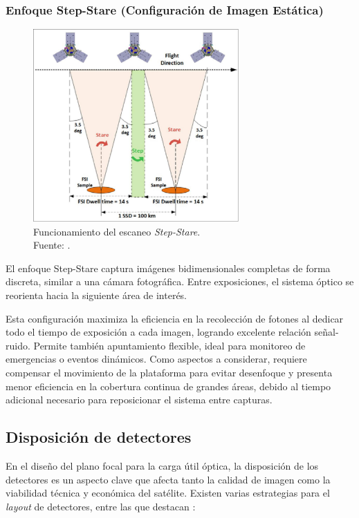 \subsubsection{Enfoque Step-Stare (Configuración de Imagen Estática)}

\begin{figure}[H]
    \centering
    \includegraphics[width=0.7\textwidth]{3.Conceptos_Previos/Step Stare.jpeg}
    \caption{Funcionamiento del escaneo \textit{Step-Stare}.\\Fuente: \cite{step_stare_system}.}
    \label{fig:Stepstare}
\end{figure}

El enfoque Step-Stare captura imágenes bidimensionales completas de forma discreta, similar a una cámara fotográfica. Entre exposiciones, el sistema óptico se reorienta hacia la siguiente área de interés.

Esta configuración maximiza la eficiencia en la recolección de fotones al dedicar todo el tiempo de exposición a cada imagen, logrando excelente relación señal-ruido. Permite también apuntamiento flexible, ideal para monitoreo de emergencias o eventos dinámicos. Como aspectos a considerar, requiere compensar el movimiento de la plataforma para evitar desenfoque y presenta menor eficiencia en la cobertura continua de grandes áreas, debido al tiempo adicional necesario para reposicionar el sistema entre capturas.

\subsection{Disposición de detectores}

En el diseño del plano focal para la carga útil óptica, la disposición de los detectores es un aspecto clave que afecta tanto la calidad de imagen como la viabilidad técnica y económica del satélite. Existen varias estrategias para el \textit{layout} de detectores, entre las que destacan \cite{kaplan_optical_2011}:

